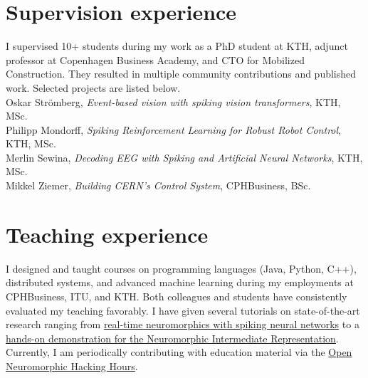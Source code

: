 \documentclass[11pt, a4paper]{article}
\newcommand{\years}[1]{\marginnote{\scriptsize #1}}
\begin{document}
\section*{Supervision experience}
I supervised 10+ students during my work as a PhD student at KTH, adjunct professor at Copenhagen Business Academy, and CTO for Mobilized Construction.
They resulted in multiple community contributions and published work.
Selected projects are listed below. \\
\years{2024}Oskar Strömberg, \emph{Event-based vision with spiking vision transformers}, KTH, MSc. \\
\years{2022}Philipp Mondorff, \emph{Spiking Reinforcement Learning for Robust Robot Control}, KTH, MSc.\\
\years{2022}Merlin Sewina, \emph{Decoding EEG with Spiking and Artificial Neural Networks}, KTH, MSc.\\
\years{2020}Mikkel Ziemer, \emph{Building CERN's Control System}, CPHBusiness, BSc.

\section*{Teaching experience}
I designed and taught courses on programming languages (Java, Python, C++), distributed systems, and advanced machine learning during my employments at CPHBusiness, ITU, and KTH.
Both colleagues and students have consistently evaluated my teaching favorably.
I have given several tutorials on state-of-the-art research ranging from \href{https://uzh.mediaspace.cast.switch.ch/media/NEUROTECH+TutorialA+Real-time+neuromorphics+with+Norse/0_hynhzm4b/12519}{real-time neuromorphics with spiking neural networks} to a \href{https://www.youtube.com/watch?v=A96rInDg8zo}{hands-on demonstration for the Neuromorphic Intermediate Representation}.
Currently, I am periodically contributing with education material via the \href{https://www.youtube.com/@hackinghours}{Open Neuromorphic Hacking Hours}.

\vspace{-0.2cm}
\end{document}

